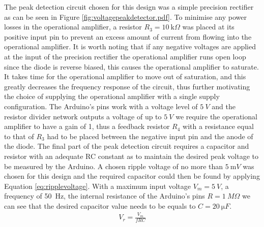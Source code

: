 The peak detection circuit chosen for this design was a simple precision rectifier as can be seen in Figure \ref{fig:voltagepeakdetector.pdf}. To minimise any power losses in the operational amplifier, a resistor $R_3=\SI{10}{\kilo \Omega}$ was placed at its positive input pin to prevent an excess amount of current from flowing into the operational amplifier. It is worth noting that if any negative voltages are applied at the input of the precision rectifier the operational amplifier runs open loop since the diode is reverse biased, this causes the operational amplifier to saturate. It takes time for the operational amplifier to move out of saturation, and this greatly decreases the frequency response of the circuit, thus further motivating the choice of supplying the operational amplifier with a single supply configuration. \vspace{4mm} \newline
The Arduino's pins work with a voltage level of $\SI{5}{V}$ and the resistor divider network outputs a voltage of up to $\SI{5}{V}$ we require the operational amplifier to have a gain of 1, thus a feedback resistor $R_4$ with a resistance equal to that of $R_3$ had to be placed between the negative input pin and the anode of the diode.
The final part of the peak detection circuit requires a capacitor and resistor with an adequate RC constant as to maintain the desired peak voltage to be measured by the Arduino. A chosen ripple voltage of no more than $\SI{5}{\milli V}$ was chosen for this design and the required capacitor could then be found by applying Equation \ref{eq:ripplevoltage}. With a maximum input voltage $V_{m}=\SI{5}{V}$, a frequency of \SI{50}{Hz}, the internal resistance of the Arduino's pins $R=\SI{1}{M\Omega}$ we can see that the desired capacitor value needs to be equals to $C=\SI{20}{\micro F}$.\newline
\begin{align}
  V_{r} = \frac{V_{m}}{fRC} 
   \label{eq:ripplevoltage}
\end{align}
